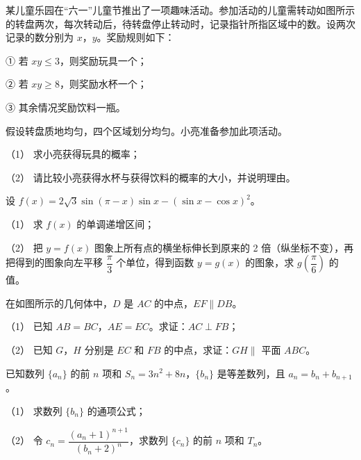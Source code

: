 \Needspace{0.4\textheight}
\begin{question}
某儿童乐园在“六一”儿童节推出了一项趣味活动。参加活动的儿童需转动如图所示的转盘两次，每次转动后，待转盘停止转动时，记录指针所指区域中的数。设两次记录的数分别为 \(x\)，\(y\)。奖励规则如下：

① 若 \(xy\leqslant 3\)，则奖励玩具一个；

② 若 \(xy\geqslant 8\)，则奖励水杯一个；

③ 其余情况奖励饮料一瓶。

假设转盘质地均匀，四个区域划分均匀。小亮准备参加此项活动。

（1） 求小亮获得玩具的概率；

（2） 请比较小亮获得水杯与获得饮料的概率的大小，并说明理由。
\nopagebreak[4]
\begin{center}\end{center}
\nopagebreak[4]
\end{question}
\begin{question}
设 \(f(x)=2\sqrt{3}\sin(\pi-x)\sin x-(\sin x-\cos x)^2\)。

（1） 求 \(f(x)\) 的单调递增区间；

（2） 把 \(y=f(x)\) 图象上所有点的横坐标伸长到原来的 2 倍（纵坐标不变），再把得到的图象向左平移 \(\dfrac{\pi}{3}\) 个单位，得到函数 \(y=g(x)\) 的图象，求 \(g\left(\dfrac{\pi}{6}\right)\) 的值。

\Needspace{0.4\textheight}
\end{question}
\begin{question}
在如图所示的几何体中，\(D\) 是 \(AC\) 的中点，\(EF\parallel DB\)。

（1） 已知 \(AB=BC\)，\(AE=EC\)。求证：\(AC\perp FB\)；

（2） 已知 \(G\)，\(H\) 分别是 \(EC\) 和 \(FB\) 的中点，求证：\(GH\parallel\) 平面 \(ABC\)。
\nopagebreak[4]
\begin{center}\end{center}
\nopagebreak[4]
\end{question}
\begin{question}
已知数列 \(\{a_n\}\) 的前 \(n\) 项和 \(S_n=3n^2+8n\)，\(\{b_n\}\) 是等差数列，且 \(a_n=b_n+b_{n+1}\)。

（1） 求数列 \(\{b_n\}\) 的通项公式；

（2） 令 \(c_n=\dfrac{(a_n+1)^{n+1}}{(b_n+2)^n}\)，求数列 \(\{c_n\}\) 的前 \(n\) 项和 \(T_n\)。

\end{question}
